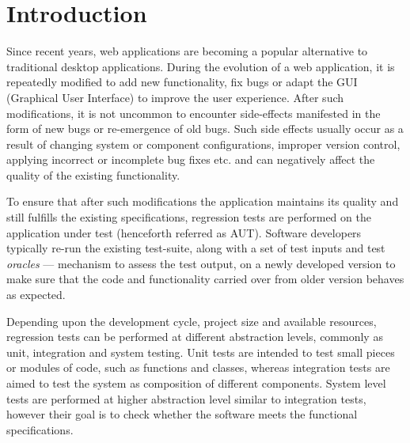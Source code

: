 \chapter{Introduction} %


\label{Chapter1} %

Since recent years, web applications are becoming a popular alternative to traditional desktop applications.
During the evolution of a web application, it is repeatedly modified to add new functionality, fix bugs or adapt the GUI (Graphical User Interface) to improve the user experience. After such modifications, it is not uncommon to encounter side-effects manifested in the form of new bugs or re-emergence of old bugs. Such side effects usually occur as a result of changing system or component configurations, improper version control, applying incorrect or incomplete bug fixes etc. and can negatively affect the quality of the existing functionality. 

To ensure that after such modifications the application maintains its quality and still fulfills the existing specifications, regression tests are performed on the application under test (henceforth referred as AUT). Software developers typically re-run the existing test-suite\cite{rothermel2001prioritizing},\cite{elbaum2000prioritizing} along with a set of test inputs and test \textit{oracles} — mechanism to assess the test output\cite{1240304}, on a newly developed version to make sure that the code and functionality carried over from older version behaves as expected.

Depending upon the development cycle, project size and available resources, regression tests can be performed at different abstraction levels, commonly as unit, integration and system testing. Unit tests are intended to test small pieces or modules of code, such as functions and classes, whereas integration tests are aimed to test the system as composition of different components. System level tests are performed at higher abstraction level similar to integration tests, however their goal is to check whether the software meets the functional specifications. 

